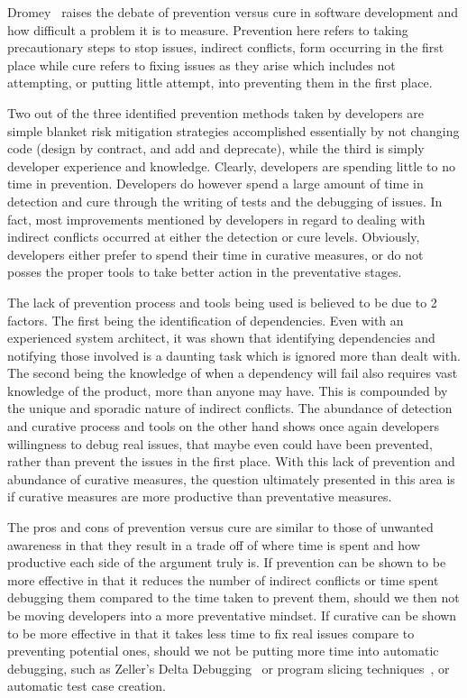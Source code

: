 \documentclass[conference]{IEEEtran}
\begin{document}
Dromey~\cite{Dromey:2003} raises the debate of prevention versus cure in software development and how difficult a problem it is
to measure. Prevention here refers to taking precautionary steps to stop issues, indirect conflicts, form occurring in the first
place while cure refers to fixing issues as they arise which includes not attempting, or putting little attempt, into preventing
them in the first place.

Two out of the three identified prevention methods taken by developers are simple blanket risk mitigation strategies
accomplished essentially by
not changing code (design by contract, and add and deprecate), while the third is simply developer experience and knowledge. Clearly,
developers are spending little to no time in prevention. Developers do however spend a large amount of time in detection and cure through the
writing of tests and the debugging of issues. In fact, most improvements mentioned by developers in regard to dealing with indirect
conflicts occurred at either the detection or cure levels. Obviously, developers either prefer to spend their time in curative
measures, or do not posses the proper tools to take better action in the preventative stages.

The lack of prevention process and tools being used is believed to be due to 2 factors. The first being the identification of dependencies.
Even with an experienced system architect, it was shown that identifying dependencies and notifying those involved is a daunting task 
which is ignored more than dealt with. The second being the knowledge of when a dependency will fail also requires vast knowledge
of the product, more than anyone may have. This is compounded by the unique and sporadic nature of indirect conflicts. The
abundance of detection and curative process and tools on the other hand shows once again developers willingness to debug
real issues, that maybe even could have been prevented, rather than prevent the issues in the first place. With
this lack of prevention and abundance of curative measures, the question ultimately presented in this area is if 
curative measures are more productive than preventative measures.

The pros and cons of prevention versus cure are similar to those of unwanted awareness in that they result in a trade off 
of where time is spent and how productive each side of the argument truly is. If prevention can be shown to be more effective in that
it reduces the number of indirect conflicts or time spent debugging them compared to the time taken to prevent them, should we then
not be moving developers into a more preventative mindset. If curative can be shown to be more effective in that it takes less time
to fix real issues compare to preventing potential ones, should we not be putting more time into automatic debugging, such as
Zeller's Delta Debugging~\cite{Zeller:2002:ICC} or program slicing techniques~\cite{Weiser:1982:PUS}, or automatic test case creation.
\end{document}
